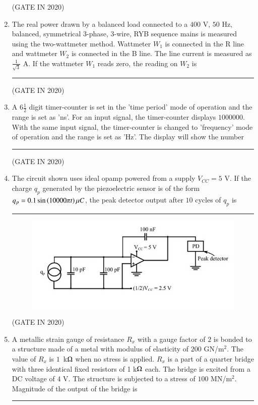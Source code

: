 \documentclass[journal,12pt,onecolumn]{IEEEtran}
\theoremstyle{remark}
\begin{document}
\begin{enumerate}
\hfill{(GATE IN 2020)}

\item The real power drawn by a balanced load connected to a $400$ V, $50$ Hz, balanced, symmetrical 3-phase, 3-wire, RYB sequence mains is measured using the two-wattmeter method. Wattmeter $W_1$ is connected in the R line and wattmeter $W_2$ is connected in the B line. The line current is measured as $\frac{1}{\sqrt{3}}$ A. If the wattmeter $W_1$ reads zero, the reading on $W_2$  is \rule{2cm}{0.4pt}

\hfill{(GATE IN 2020)}

\item A $6\frac{1}{2}$ digit timer-counter is set in the 'time period' mode of operation and the range is set as 'ns'. For an input signal, the timer-counter displays $1000000$. With the same input signal, the timer-counter is changed to 'frequency' mode of operation and the range is set as 'Hz'. The display will show the number \rule{2cm}{0.4pt}

\hfill{(GATE IN 2020)}

\item The circuit shown uses ideal opamp powered from a supply $V_{CC} = 5$ V. If the charge $q_p$ generated by the piezoelectric sensor is of the form $q_p = 0.1 \sin\left(10000\pi t\right)\mu C$, the peak detector output after $10$ cycles of $q_p$  is \rule{2cm}{0.4pt}
\begin{figure}[H]
\centering
\includegraphics[width=0.6\columnwidth]{figs/q20.jpg}
\caption*{}
\label{fig:q20}
\end{figure}

\hfill{(GATE IN 2020)}

\item A metallic strain gauge of resistance $R_x$ with a gauge factor of $2$ is bonded to a structure made of a metal with modulus of elasticity of $200$ GN/m$^2$. The value of $R_x$ is $1$~k$\ohm$ when no stress is applied. $R_x$ is a part of a quarter bridge with three identical fixed resistors of 1 k$\ohm$ each. The bridge is excited from a DC voltage of $4$ V. The structure is subjected to a stress of $100$ MN/m$^2$. Magnitude of the output of the bridge  is \rule{2cm}{0.4pt}


\end{enumerate}
\end{document}
